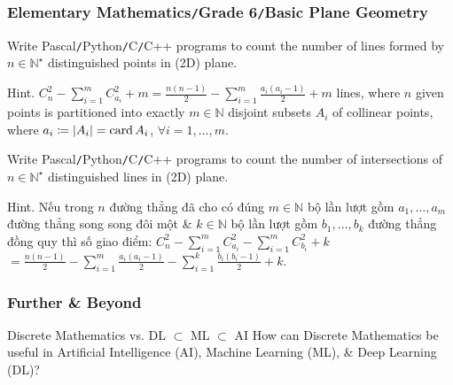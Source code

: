 \documentclass{beamer}
\begin{document}
\begin{frame}
	\frametitle{Elementary Mathematics{\tt/}Grade 6{\tt/}Basic Plane Geometry}
	\begin{problem}
		Write {\sf Pascal{\tt/}Python{\tt/}C{\tt/}C++} programs to count the number of lines formed by $n\in\mathbb{N}^\star$ distinguished points in (2D) plane.
	\end{problem}
	
	\begin{small}
		{\sf Hint.} $C_n^2 - \sum_{i=1}^m C_{a_i}^2 + m = \frac{n(n - 1)}{2} - \sum_{i=1}^m \frac{a_i(a_i - 1)}{2} + m$ lines, where $n$ given points is partitioned into exactly $m\in\mathbb{N}$ disjoint subsets $A_i$ of collinear points, where $a_i\coloneqq|A_i| = {\rm card}\,A_i$, $\forall i = 1,\ldots,m$.
	\end{small}	
	
	\begin{problem}
		Write {\sf Pascal{\tt/}Python{\tt/}C{\tt/}C++} programs to count the number of intersections of $n\in\mathbb{N}^\star$ distinguished lines in (2D) plane.
	\end{problem}
	
	\begin{small}
		{\sf Hint.} Nếu trong $n$ đường thẳng đã cho có đúng $m\in\mathbb{N}$ bộ lần lượt gồm $a_1,\ldots,a_m$ đường thẳng song song đôi một \& $k\in\mathbb{N}$ bộ lần lượt gồm $b_1,\ldots,b_k$ đường thẳng đồng quy thì số giao điểm: $C_n^2 - \sum_{i=1}^m C_{a_i}^2 - \sum_{i=1}^m C_{b_i}^2 + k$ $= \frac{n(n - 1)}{2} - \sum_{i=1}^m \frac{a_i(a_i - 1)}{2} - \sum_{i=1}^k \frac{b_i(b_i - 1)}{2} + k$.
	\end{small}
\end{frame}

\begin{frame}
	\frametitle{Further \& Beyond}
	\begin{block}{Discrete Mathematics vs. DL $\subset$ ML $\subset$ AI}
		How can Discrete Mathematics be useful in Artificial Intelligence (AI), Machine Learning (ML), \& Deep Learning (DL)?
	\end{block}
	
\end{frame}
\end{document}

